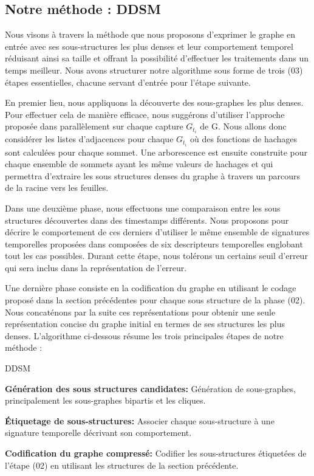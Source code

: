 \documentclass[a4paper,oneside,12pt]{report}
\theoremstyle{definition}
\begin{document}
			\subsection{Notre méthode : DDSM}
			 Nous visons à travers la méthode que nous proposons d'exprimer le graphe en entrée avec ses sous-structures les plus denses et leur comportement temporel réduisant ainsi sa taille et offrant la possibilité d'effectuer les traitements dans un temps meilleur. Nous avons structurer notre algorithme sous forme de trois (03) étapes essentielles, chacune servant d'entrée pour l'étape suivante.
			 
			 En premier lieu, nous appliquons la découverte des sous-graphes les plus denses. Pour effectuer cela de manière efficace, nous suggérons d'utiliser l'approche proposée dans \citep{hernandez2014compressed} parallèlement sur chaque capture $G_{t_{i}}$ de G. Nous allons donc considérer les listes d'adjacences pour chaque $G_{t_{i}}$ où des fonctions de hachages sont calculées pour chaque sommet. Une arborescence est ensuite construite pour chaque ensemble de sommets ayant les même valeurs de hachages et qui permettra d'extraire les sous structures denses du graphe à travers un parcours de la racine vers les feuilles. 
			 
			 Dans une deuxième phase, nous effectuons une comparaison entre les sous structures découvertes dans des timestamps différents. Nous proposons pour décrire le comportement de ces derniers d'utiliser le même ensemble de signatures temporelles proposées dans \citep{shah2015timecrunch} composées de six descripteurs temporelles englobant tout les cas possibles. Durant cette étape, nous tolérons un certains seuil d'erreur qui sera inclus dans la représentation de l'erreur.
			 
			 Une dernière phase consiste en la codification du graphe en utilisant le codage proposé dans la section précédentes pour chaque sous structure de la phase (02). Nous concaténons par la suite ces représentations pour obtenir une seule représentation concise du graphe initial en termes de ses structures les plus denses. 
			L'algorithme ci-dessous résume les trois principales étapes de notre méthode :
			\begin{algorithm}
					\label{alg:DDSM}
					\caption{DDSM}
					\label{Pseudo Algorithme de la méthode proposée (DDSM)}
				\begin{algorithmic} [1]
					\STATE \textbf{Génération des sous structures candidates: }Génération de sous-graphes, principalement les sous-graphes bipartis et les cliques.
					
					\STATE  \textbf{Étiquetage de sous-structures: }Associer chaque sous-structure à une signature temporelle décrivant son comportement.
					
					\STATE \textbf{Codification du graphe compressé: }Codifier les sous-structures étiquetées de l'étape (02) en utilisant les structures de la section précédente.
				\end{algorithmic}
			\end{algorithm}
			
\end{document}
